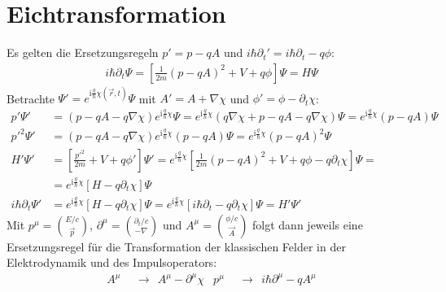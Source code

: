 \documentclass[a4paper,12pt]{article}
\newcommand{\kla}{}
\newcommand{\klam}{}
\newcommand{\tecxt}{}
\begin{document}
\section{Eichtransformation}
Es gelten die Ersetzungsregeln $p'=p-qA$ und $i\hbar\partial_t'=i\hbar\partial_t-q\phi$:
\begin{align*}
i\hbar\partial_t\Psi=\klam\left[ {\frac{1}{2m}\kla\left( {p-qA} \right)^2+V+q\phi} \right]\Psi=H\Psi
\end{align*}
Betrachte $\Psi'=e^{\tecxt\text{i}\frac{q}{\hbar}\chi(\vec{r}, t)}\Psi$ mit $A'=A+\nabla\chi$ und $\phi'=\phi-\partial_t\chi$:
\begin{align*}
p'\Psi'&=\kla\left( {p-qA-q\nabla\chi} \right)e^{\tecxt\text{i}\frac{q}{\hbar}\chi}\Psi=e^{\tecxt\text{i}\frac{q}{\hbar}\chi}\kla\left( {q\nabla\chi + p-qA-q\nabla\chi} \right)\Psi=e^{\tecxt\text{i}\frac{q}{\hbar}\chi}(p-qA)\Psi\\
p'^2\Psi'&=(p-qA-q\nabla\chi)e^{\tecxt\text{i}\frac{q}{\hbar}\chi}(p-qA)\Psi=e^{\tecxt\text{i}\frac{q}{\hbar}\chi}(p-qA)^2\Psi\\
H'\Psi'&=\klam\left[ {\frac{p'^2}{2m}+V+q\phi'} \right]\Psi'=e^{\tecxt\text{i}\frac{q}{\hbar}\chi}\klam\left[ {\frac{1}{2m}(p-qA)^2+V+q\phi-q\partial_t\chi} \right]\Psi=\\
&=e^{\tecxt\text{i}\frac{q}{\hbar}\chi}\klam\left[ {H-q\partial_t\chi} \right]\Psi\\
i\hbar\partial_t\Psi'&=e^{\tecxt\text{i}\frac{q}{\hbar}\chi}\klam\left[ {H-q\partial_t\chi} \right]\Psi=e^{\tecxt\text{i}\frac{q}{\hbar}\chi}\klam\left[ {i\hbar\partial_t-q\partial_t\chi} \right]\Psi=H'\Psi'
\end{align*}
Mit $p^\mu=\binom{E/c}{\vec{p}}$, $\partial^\mu=\binom{\partial_t/c}{-\nabla}$ und $A^\mu=\binom{\phi/c}{\vec{A}}$ folgt dann jeweils eine Ersetzungsregel für die Transformation der klassischen Felder in der Elektrodynamik und des Impulsoperators:
\begin{align*}
A^\mu\ \ &\longrightarrow\ \ A^\mu -\partial^\mu\chi &p^\mu\ \ &\longrightarrow\ \ i\hbar\partial^\mu - qA^\mu 
\end{align*}
\end{document}
